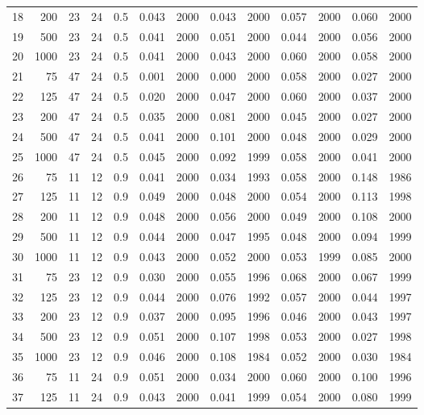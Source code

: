 \documentclass{article}
\begin{document}
\begin{table}[ht]
\begin{center}
\begin{tabular}{rrrrrrrrrrrrr}
  18 & 200 & 23 & 24 & 0.5 & 0.043 & 2000 & 0.043 & 2000 & 0.057 & 2000 & 0.060 & 2000 \\ 
  19 & 500 & 23 & 24 & 0.5 & 0.041 & 2000 & 0.051 & 2000 & 0.044 & 2000 & 0.056 & 2000 \\ 
  20 & 1000 & 23 & 24 & 0.5 & 0.041 & 2000 & 0.043 & 2000 & 0.060 & 2000 & 0.058 & 2000 \\ 
   \hline
21 & 75 & 47 & 24 & 0.5 & 0.001 & 2000 & 0.000 & 2000 & 0.058 & 2000 & 0.027 & 2000 \\ 
  22 & 125 & 47 & 24 & 0.5 & 0.020 & 2000 & 0.047 & 2000 & 0.060 & 2000 & 0.037 & 2000 \\ 
  23 & 200 & 47 & 24 & 0.5 & 0.035 & 2000 & 0.081 & 2000 & 0.045 & 2000 & 0.027 & 2000 \\ 
  24 & 500 & 47 & 24 & 0.5 & 0.041 & 2000 & 0.101 & 2000 & 0.048 & 2000 & 0.029 & 2000 \\ 
  25 & 1000 & 47 & 24 & 0.5 & 0.045 & 2000 & 0.092 & 1999 & 0.058 & 2000 & 0.041 & 2000 \\ 
   \hline
26 & 75 & 11 & 12 & 0.9 & 0.041 & 2000 & 0.034 & 1993 & 0.058 & 2000 & 0.148 & 1986 \\ 
  27 & 125 & 11 & 12 & 0.9 & 0.049 & 2000 & 0.048 & 2000 & 0.054 & 2000 & 0.113 & 1998 \\ 
  28 & 200 & 11 & 12 & 0.9 & 0.048 & 2000 & 0.056 & 2000 & 0.049 & 2000 & 0.108 & 2000 \\ 
  29 & 500 & 11 & 12 & 0.9 & 0.044 & 2000 & 0.047 & 1995 & 0.048 & 2000 & 0.094 & 1999 \\ 
  30 & 1000 & 11 & 12 & 0.9 & 0.043 & 2000 & 0.052 & 2000 & 0.053 & 1999 & 0.085 & 2000 \\ 
   \hline
31 & 75 & 23 & 12 & 0.9 & 0.030 & 2000 & 0.055 & 1996 & 0.068 & 2000 & 0.067 & 1999 \\ 
  32 & 125 & 23 & 12 & 0.9 & 0.044 & 2000 & 0.076 & 1992 & 0.057 & 2000 & 0.044 & 1997 \\ 
  33 & 200 & 23 & 12 & 0.9 & 0.037 & 2000 & 0.095 & 1996 & 0.046 & 2000 & 0.043 & 1997 \\ 
  34 & 500 & 23 & 12 & 0.9 & 0.051 & 2000 & 0.107 & 1998 & 0.053 & 2000 & 0.027 & 1998 \\ 
  35 & 1000 & 23 & 12 & 0.9 & 0.046 & 2000 & 0.108 & 1984 & 0.052 & 2000 & 0.030 & 1984 \\ 
   \hline
36 & 75 & 11 & 24 & 0.9 & 0.051 & 2000 & 0.034 & 2000 & 0.060 & 2000 & 0.100 & 1996 \\ 
  37 & 125 & 11 & 24 & 0.9 & 0.043 & 2000 & 0.041 & 1999 & 0.054 & 2000 & 0.080 & 1999 \\ 

\end{tabular}
\end{center}
\end{table}
\end{document}
